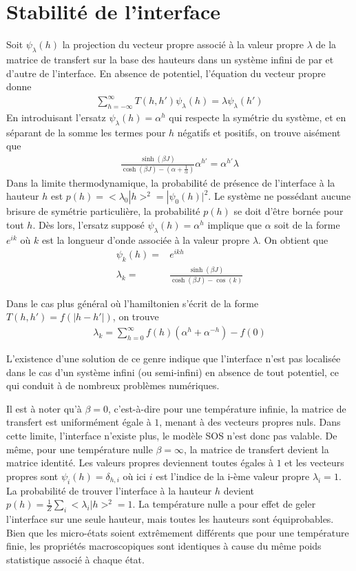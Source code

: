 	\section{Stabilité de l'interface}

	Soit $\psi_\lambda(h)$ la projection du vecteur propre associé à la valeur propre $\lambda$ de la matrice de transfert sur la base des hauteurs dans un système infini de par et d'autre de l'interface. En absence de potentiel\cite{guyer1979}, l'équation du vecteur propre donne
\begin{align}
	\sum_{h=-\infty}^\infty T(h,h') \psi_\lambda(h) = \lambda \psi_\lambda(h')
\end{align}
En introduisant l'ersatz $\psi_\lambda(h) = \alpha^h$ qui respecte la symétrie du système, et en séparant de la somme les termes pour $h$ négatifs et positifs, on trouve aisément que 
\begin{align}
	\frac{\sinh(\beta J)}{\cosh(\beta J)-(\alpha+\frac{1}{\alpha})} \alpha^{h'} = \alpha^{h'} \lambda
\end{align}
Dans la limite thermodynamique, la probabilité de présence de l'interface à la hauteur $h$ est $p(h) = <\lambda_0|h>^2 = |\psi_0(h)|^2$. Le système ne possédant aucune brisure de symétrie particulière, la probabilité $p(h)$ se doit d'être bornée pour tout $h$. Dès lors, l'ersatz supposé $\psi_\lambda(h) = \alpha^h$ implique que $\alpha$ soit de la forme $e^{ik}$ où $k$ est la longueur d'onde associée à la valeur propre $\lambda$. On obtient que 
\begin{align}
	\psi_k(h) =& e^{ikh} \\
	\lambda_k =& \frac{\sinh(\beta J)}{\cosh(\beta J) - \cos(k)}
\end{align}


Dans le cas plus général où l'hamiltonien s'écrit de la forme $T(h,h') = f(|h-h'|)$, on trouve 
\begin{align}
	\lambda_k = \sum_{h=0}^\infty f(h)(\alpha^h+\alpha^{-h}) - f(0)
\end{align}

L'existence d'une solution de ce genre indique que l'interface n'est pas localisée dans le cas d'un système infini (ou semi-infini) en absence de tout potentiel, ce qui conduit à de nombreux problèmes numériques. 

Il est à noter qu'à $\beta=0$, c'est-à-dire pour une température infinie, la matrice de transfert est uniformément égale à $1$, menant à des vecteurs propres nuls. Dans cette limite, l'interface n'existe plus, le modèle SOS n'est donc pas valable. De même, pour une température nulle $\beta=\infty$, la matrice de transfert devient la matrice identité. Les valeurs propres deviennent toutes égales à $1$ et les vecteurs propres sont $\psi_i(h) = \delta_{h,i}$ où ici $i$ est l'indice de la i-ème valeur propre $\lambda_i = 1$. La probabilité de trouver l'interface à la hauteur $h$ devient $p(h) = \frac{1}{Z}\sum_{i} <\lambda_i | h >^2 = 1$. La température nulle a pour effet de geler l'interface sur une seule hauteur, mais toutes les hauteurs sont équiprobables. Bien que les micro-états soient extrêmement différents que pour une température finie, les propriétés macroscopiques sont identiques à cause du même poids statistique associé à chaque état.


